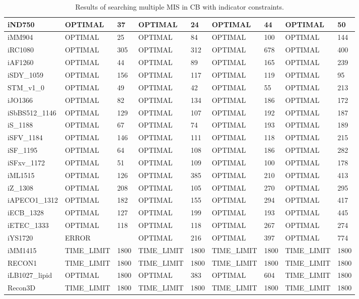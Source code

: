 \begin{table}[!ht]
\begin{tabular}{|l|l|l|l|l|l|l|l|l|}
        iND750 & OPTIMAL & 37 & OPTIMAL & 24 & OPTIMAL & 44 & OPTIMAL & 50 \\ \hline
        iMM904 & OPTIMAL & 25 & OPTIMAL & 84 & OPTIMAL & 100 & OPTIMAL & 144 \\ \hline
        iRC1080 & OPTIMAL & 305 & OPTIMAL & 312 & OPTIMAL & 678 & OPTIMAL & 400 \\ \hline
        iAF1260 & OPTIMAL & 44 & OPTIMAL & 89 & OPTIMAL & 165 & OPTIMAL & 239 \\ \hline
        iSDY\_1059 & OPTIMAL & 156 & OPTIMAL & 117 & OPTIMAL & 119 & OPTIMAL & 95 \\ \hline
        STM\_v1\_0 & OPTIMAL & 49 & OPTIMAL & 42 & OPTIMAL & 55 & OPTIMAL & 213 \\ \hline
        iJO1366 & OPTIMAL & 82 & OPTIMAL & 134 & OPTIMAL & 186 & OPTIMAL & 172 \\ \hline
        iSbBS512\_1146 & OPTIMAL & 129 & OPTIMAL & 107 & OPTIMAL & 192 & OPTIMAL & 187 \\ \hline
        iS\_1188 & OPTIMAL & 67 & OPTIMAL & 74 & OPTIMAL & 193 & OPTIMAL & 189 \\ \hline
        iSFV\_1184 & OPTIMAL & 146 & OPTIMAL & 111 & OPTIMAL & 118 & OPTIMAL & 215 \\ \hline
        iSF\_1195 & OPTIMAL & 64 & OPTIMAL & 108 & OPTIMAL & 186 & OPTIMAL & 282 \\ \hline
        iSFxv\_1172 & OPTIMAL & 51 & OPTIMAL & 109 & OPTIMAL & 100 & OPTIMAL & 178 \\ \hline
        iML1515 & OPTIMAL & 126 & OPTIMAL & 385 & OPTIMAL & 210 & OPTIMAL & 413 \\ \hline
        iZ\_1308 & OPTIMAL & 208 & OPTIMAL & 105 & OPTIMAL & 270 & OPTIMAL & 295 \\ \hline
        iAPECO1\_1312 & OPTIMAL & 182 & OPTIMAL & 155 & OPTIMAL & 294 & OPTIMAL & 417 \\ \hline
        iECB\_1328 & OPTIMAL & 127 & OPTIMAL & 199 & OPTIMAL & 193 & OPTIMAL & 445 \\ \hline
        iETEC\_1333 & OPTIMAL & 118 & OPTIMAL & 118 & OPTIMAL & 267 & OPTIMAL & 274 \\ \hline
        iYS1720 & ERROR & ~ & OPTIMAL & 216 & OPTIMAL & 397 & OPTIMAL & 774 \\ \hline
        iMM1415 & TIME\_LIMIT & 1800 & TIME\_LIMIT & 1800 & TIME\_LIMIT & 1800 & TIME\_LIMIT & 1800 \\ \hline
        RECON1 & TIME\_LIMIT & 1800 & TIME\_LIMIT & 1800 & TIME\_LIMIT & 1800 & TIME\_LIMIT & 1800 \\ \hline
        iLB1027\_lipid & OPTIMAL & 1800 & OPTIMAL & 383 & OPTIMAL & 604 & TIME\_LIMIT & 1800 \\ \hline
        Recon3D & TIME\_LIMIT & 1800 & TIME\_LIMIT & 1800 & TIME\_LIMIT & 1800 & TIME\_LIMIT & 1800 \\ \hline
    \end{tabular}
    \caption{\label{Tab:multiple_mis_indicator} Results of searching multiple MIS in CB with indicator constraints.}
\end{table}

